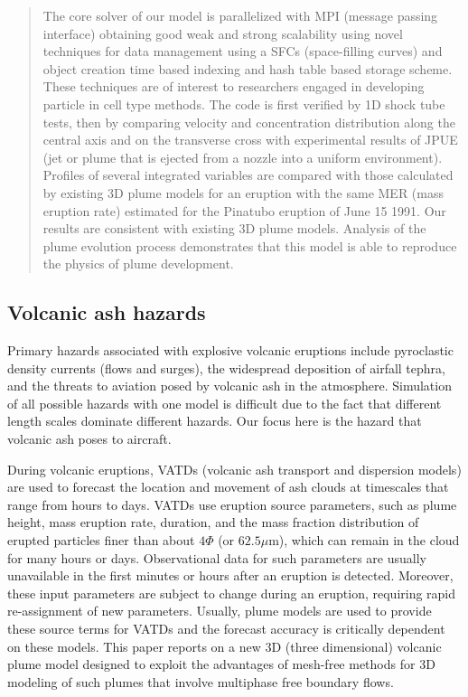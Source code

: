 \documentclass[gmd, manuscript]{copernicus}
\begin{document}
\begin{abstract}
The core solver of our model is parallelized with MPI (message passing interface) obtaining good weak and strong scalability using novel techniques for data management using a SFCs (space-filling curves) and object creation time based indexing and hash table based storage scheme. These techniques are of interest to researchers engaged in developing particle in cell type methods. The code is first verified by 1D shock tube tests, then by comparing velocity and concentration distribution along the central axis and on the transverse
cross with experimental results of JPUE (jet or plume that is ejected from a nozzle into a uniform environment). 
Profiles of several integrated variables are compared with those calculated by existing 3D plume models for an eruption with the same MER (mass eruption rate) estimated for the Pinatubo eruption of June 15 1991. Our results are consistent with existing 3D plume models. Analysis of the plume evolution process demonstrates that this model is able to reproduce the physics of plume development. 

\end{abstract}

\introduction  %
\subsection{Volcanic ash hazards}
Primary hazards associated with explosive volcanic eruptions include pyroclastic density currents (flows and surges), the widespread deposition of airfall tephra, and the threats to aviation posed by volcanic ash in the atmosphere.
Simulation of all possible hazards with one model is difficult due to the fact that different length scales dominate different hazards. Our focus here is the hazard that volcanic ash poses to aircraft. 

During volcanic eruptions, VATDs (volcanic ash transport and dispersion models) are used to forecast the location and movement of ash clouds at timescales that range from hours to days. VATDs use eruption source parameters, such as plume height, mass eruption rate, duration, and the mass fraction distribution of erupted particles finer than about $4 \Phi$ (or $62.5 \mu$m), which can remain in the cloud for many hours or days. Observational data for such parameters are usually unavailable in the first minutes or hours after an eruption is detected. Moreover, these input parameters are subject to change during an eruption, requiring rapid re-assignment of new parameters. Usually, plume models are used to provide these source terms for VATDs and the forecast accuracy is critically dependent on these models. This paper reports on a new 3D (three dimensional) volcanic plume model designed to exploit the advantages of mesh-free methods for 3D modeling of such plumes that involve multiphase free boundary flows.
\end{document}
